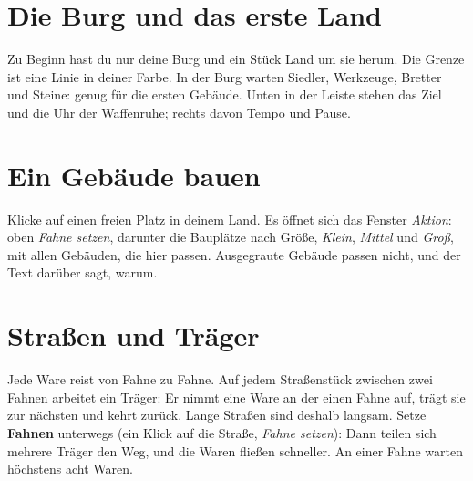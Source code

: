 \documentclass[a4paper,11pt,oneside,DIV=12,headings=small,toc=chapterentrydotfill]{scrbook}
\begin{document}

\section{Die Burg und das erste Land}
Zu Beginn hast du nur deine Burg und ein Stück Land um sie herum. Die Grenze ist eine Linie in deiner Farbe.
In der Burg warten Siedler, Werkzeuge, Bretter und Steine: genug für die ersten Gebäude. Unten in der Leiste
stehen das Ziel und die Uhr der Waffenruhe; rechts davon Tempo und Pause.


\section{Ein Gebäude bauen}
Klicke auf einen freien Platz in deinem Land. Es öffnet sich das Fenster \emph{Aktion}: oben \emph{Fahne setzen},
darunter die Bauplätze nach Größe, \emph{Klein}, \emph{Mittel} und \emph{Groß}, mit allen Gebäuden, die
hier passen. Ausgegraute Gebäude passen nicht, und der Text darüber sagt, warum.



\section{Straßen und Träger}
Jede Ware reist von Fahne zu Fahne. Auf jedem Straßenstück zwischen zwei Fahnen arbeitet ein Träger: Er
nimmt eine Ware an der einen Fahne auf, trägt sie zur nächsten und kehrt zurück. Lange Straßen sind deshalb
langsam. Setze \textbf{Fahnen} unterwegs (ein Klick auf die Straße, \emph{Fahne setzen}): Dann teilen sich
mehrere Träger den Weg, und die Waren fließen schneller. An einer Fahne warten höchstens acht Waren.
\end{document}

